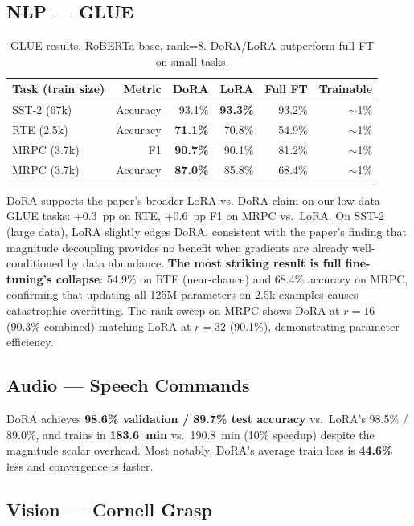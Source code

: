 \documentclass[11pt]{article}
\begin{document}
\subsection{NLP — GLUE}

\begin{table}[h!]
	\centering\small
	\begin{tabular}{@{}lrrrrr@{}}
		\toprule
		Task (train size) & Metric   & DoRA            & LoRA            & Full FT & Trainable \\
		\midrule
		SST-2 (67k)       & Accuracy & 93.1\%          & \textbf{93.3\%} & 93.2\%  & $\sim$1\% \\
		RTE (2.5k)        & Accuracy & \textbf{71.1\%} & 70.8\%          & 54.9\%  & $\sim$1\% \\
		MRPC (3.7k)       & F1       & \textbf{90.7\%} & 90.1\%          & 81.2\%  & $\sim$1\% \\
		MRPC (3.7k)       & Accuracy & \textbf{87.0\%} & 85.8\%          & 68.4\%  & $\sim$1\% \\
		\bottomrule
	\end{tabular}
	\caption{GLUE results. RoBERTa-base, rank=8. DoRA/LoRA outperform full FT on small tasks.}
\end{table}

DoRA supports the paper's broader LoRA-vs.-DoRA claim on our low-data GLUE tasks: +0.3~pp on RTE, +0.6~pp F1 on MRPC vs.\ LoRA.
On SST-2 (large data), LoRA slightly edges DoRA, consistent with the paper's finding that magnitude decoupling provides no benefit when gradients are already well-conditioned by data abundance.
\textbf{The most striking result is full fine-tuning's collapse}: 54.9\% on RTE (near-chance) and 68.4\% accuracy on MRPC, confirming that updating all 125M parameters on 2.5k examples causes catastrophic overfitting.
The rank sweep on MRPC shows DoRA at $r{=}16$ (90.3\% combined) matching LoRA at $r{=}32$ (90.1\%), demonstrating parameter efficiency.

\subsection{Audio — Speech Commands}

DoRA achieves \textbf{98.6\% validation / 89.7\% test accuracy} vs.\ LoRA's 98.5\% / 89.0\%, and trains in \textbf{183.6~min} vs.\ 190.8~min (10\% speedup) despite the magnitude scalar overhead. Most notably, DoRA's
average train loss is \textbf{44.6\%} less and convergence is faster.

\subsection{Vision — Cornell Grasp}
\end{document}
